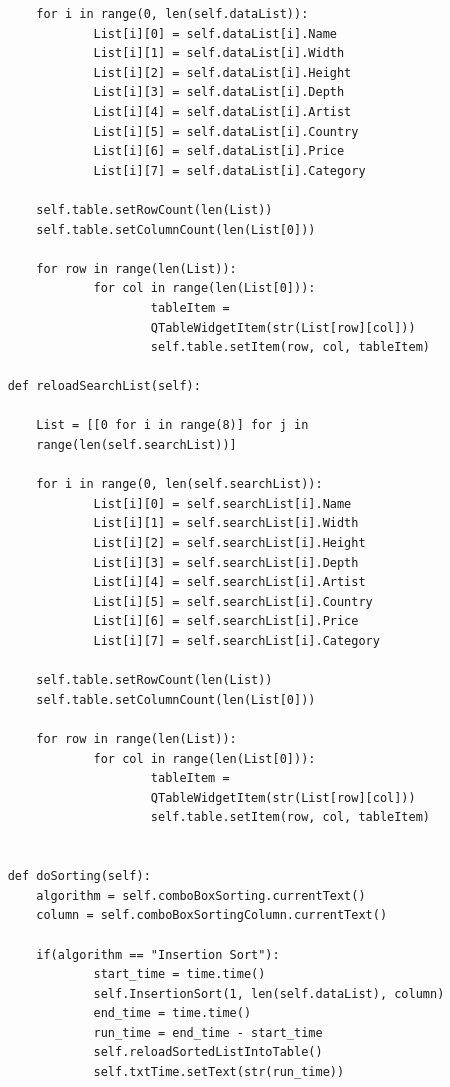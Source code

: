 \documentclass[12pt]{article}
\begin{document}
\begin{verbatim}
        for i in range(0, len(self.dataList)):
                List[i][0] = self.dataList[i].Name
                List[i][1] = self.dataList[i].Width
                List[i][2] = self.dataList[i].Height
                List[i][3] = self.dataList[i].Depth
                List[i][4] = self.dataList[i].Artist
                List[i][5] = self.dataList[i].Country
                List[i][6] = self.dataList[i].Price
                List[i][7] = self.dataList[i].Category

        self.table.setRowCount(len(List))
        self.table.setColumnCount(len(List[0]))

        for row in range(len(List)):
                for col in range(len(List[0])):
                        tableItem =
                        QTableWidgetItem(str(List[row][col]))
                        self.table.setItem(row, col, tableItem)

    def reloadSearchList(self):
        
        List = [[0 for i in range(8)] for j in
        range(len(self.searchList))]

        for i in range(0, len(self.searchList)):
                List[i][0] = self.searchList[i].Name
                List[i][1] = self.searchList[i].Width
                List[i][2] = self.searchList[i].Height
                List[i][3] = self.searchList[i].Depth
                List[i][4] = self.searchList[i].Artist
                List[i][5] = self.searchList[i].Country
                List[i][6] = self.searchList[i].Price
                List[i][7] = self.searchList[i].Category

        self.table.setRowCount(len(List))
        self.table.setColumnCount(len(List[0]))

        for row in range(len(List)):
                for col in range(len(List[0])):
                        tableItem =
                        QTableWidgetItem(str(List[row][col]))
                        self.table.setItem(row, col, tableItem)


    def doSorting(self):
        algorithm = self.comboBoxSorting.currentText()
        column = self.comboBoxSortingColumn.currentText()

        if(algorithm == "Insertion Sort"): 
                start_time = time.time()
                self.InsertionSort(1, len(self.dataList), column)
                end_time = time.time()
                run_time = end_time - start_time
                self.reloadSortedListIntoTable()
                self.txtTime.setText(str(run_time))


\end{verbatim}
\end{document}
